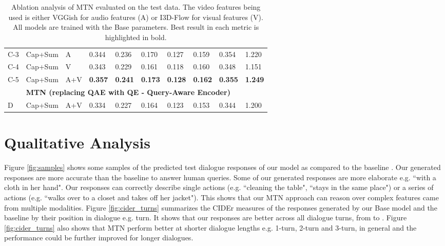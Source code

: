 \documentclass[11pt,a4paper]{article}
\begin{document}
\begin{table*}[htbp]
{\begin{tabular}{p{0.1cm}p{1.2cm}llllllll}
\multicolumn{1}{c}{C-3}                                         & Cap+Sum               & A               & 0.344          & 0.236          & 0.170          & 0.127          & 0.159           & 0.354            & 1.220          \\ 
\multicolumn{1}{c}{C-4}                                         & Cap+Sum               & V               & 0.343          & 0.229          & 0.161          & 0.118          & 0.160           & 0.348            & 1.151          \\  
\multicolumn{1}{c}{C-5}                                         & Cap+Sum               & A+V             & \textbf{0.357}          & \textbf{0.241}          & \textbf{0.173}          & \textbf{0.128}          & \textbf{0.162}           & \textbf{0.355}            & \textbf{1.249}          \\ \hline
                                         & \multicolumn{9}{l}{\textbf{MTN (replacing QAE with QE - Query-Aware Encoder)}}                                                                                         \\ \hline
D                                      & Cap+Sum               & A+V             & 0.334          & 0.227          & 0.164          & 0.123          & 0.153           & 0.344            & 1.200          \\ \hline
\end{tabular}
    }
	\caption{Ablation analysis of MTN evaluated on the test data. The video features being used is either VGGish for audio features (A) or I3D-Flow for visual features (V). All models are trained with the Base parameters. Best result in each metric is highlighted in bold.}
	\label{tab:ablation}
\end{table*}

\section{Qualitative Analysis}

Figure \ref{fig:samples} shows some samples of the predicted test dialogue responses of our model as compared to the baseline \cite{hori2018end}. Our generated responses are more accurate than the baseline to answer human queries. Some of our generated responses are more elaborate e.g. ``with a cloth in her hand". Our responses can correctly describe single actions (e.g. ``cleaning the table", ``stays in the same place") or a series of actions (e.g. ``walks over to a closet and takes off her jacket"). This shows that our MTN approach can reason over complex features came from multiple modalities. Figure \ref{fig:cider_turns} summarizes the CIDEr measures of the responses generated by our Base model and the baseline \cite{hori2018end} by their position in dialogue e.g.  turn. It shows that our responses are better across all dialogue turns, from  to . Figure \ref{fig:cider_turns} also shows that MTN perform better at shorter dialogue lengths e.g. 1-turn, 2-turn and 3-turn, in general and the performance could be further improved for longer dialogues. 
\end{document}
